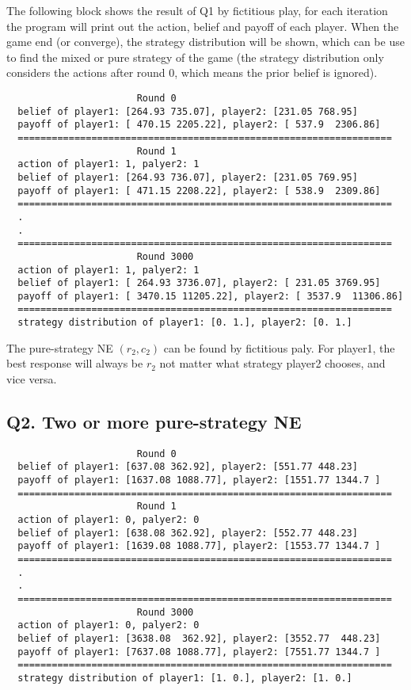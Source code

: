 \documentclass[a4paper, oneside, final, 12pt]{scrartcl} %
\begin{document}
The following block shows the result of Q1 by fictitious play, 
for each iteration the program will print out the action, belief and payoff of each player.
When the game end (or converge), the strategy distribution will be shown,
which can be use to find the mixed or pure strategy of the game
(the strategy distribution only considers the actions after round 0, 
which means the prior belief is ignored).

\begin{lstlisting}
                       Round 0
  belief of player1: [264.93 735.07], player2: [231.05 768.95]
  payoff of player1: [ 470.15 2205.22], player2: [ 537.9  2306.86]
  ==================================================================
                       Round 1
  action of player1: 1, palyer2: 1
  belief of player1: [264.93 736.07], player2: [231.05 769.95]
  payoff of player1: [ 471.15 2208.22], player2: [ 538.9  2309.86]
  ==================================================================
  .
  .
  ==================================================================
                       Round 3000
  action of player1: 1, palyer2: 1
  belief of player1: [ 264.93 3736.07], player2: [ 231.05 3769.95]
  payoff of player1: [ 3470.15 11205.22], player2: [ 3537.9  11306.86]
  ==================================================================
  strategy distribution of player1: [0. 1.], player2: [0. 1.]
\end{lstlisting}

\begingroup
\raggedright
The pure-strategy NE $(r_2, c_2)$ can be found by fictitious paly.
For player1, the best response will always be $r_2$ 
not matter what strategy player2 chooses, and vice versa.
\endgroup

\subsection{Q2. Two or more pure-strategy NE}

\begin{lstlisting}
                       Round 0
  belief of player1: [637.08 362.92], player2: [551.77 448.23]
  payoff of player1: [1637.08 1088.77], player2: [1551.77 1344.7 ]
  ==================================================================
                       Round 1
  action of player1: 0, palyer2: 0
  belief of player1: [638.08 362.92], player2: [552.77 448.23]
  payoff of player1: [1639.08 1088.77], player2: [1553.77 1344.7 ]
  ==================================================================
  .
  .
  ==================================================================
                       Round 3000
  action of player1: 0, palyer2: 0
  belief of player1: [3638.08  362.92], player2: [3552.77  448.23]
  payoff of player1: [7637.08 1088.77], player2: [7551.77 1344.7 ]
  ==================================================================
  strategy distribution of player1: [1. 0.], player2: [1. 0.]
\end{lstlisting}
\end{document}

